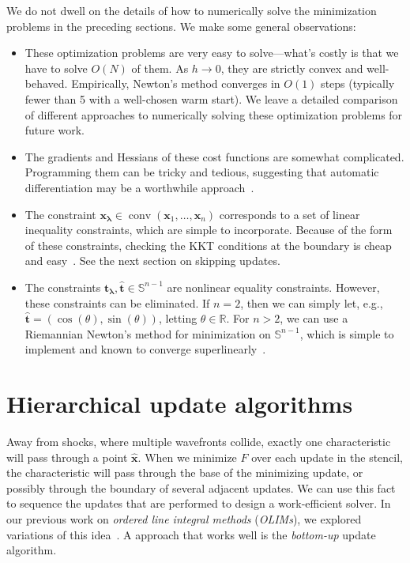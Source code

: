 \documentclass{siamart190516}
\newcommand{\m}[1]{\boldsymbol{#1}}
\newcommand{\xhat}{\hat{\m{x}}}
\newcommand{\xlam}{\m{x}_{\m{\lambda}}}
\newcommand{\that}{\hat{\m{t}}}
\newcommand{\tlam}{\m{t}_{\m{\lambda}}}
\DeclareMathOperator{\conv}{conv}
\begin{document}
We do not dwell on the details of how to numerically solve the
minimization problems in the preceding sections. We make some general
observations:
\begin{itemize}
\item These optimization problems are very easy to solve---what's
  costly is that we have to solve $O(N)$ of them. As $h \to 0$, they
  are strictly convex and well-behaved. Empirically, Newton's method
  converges in $O(1)$ steps (typically fewer than 5 with a well-chosen
  warm start). We leave a detailed comparison of different approaches
  to numerically solving these optimization problems for future work.
\item The gradients and Hessians of these cost functions are somewhat
  complicated. Programming them can be tricky and tedious, suggesting
  that automatic differentiation may be a worthwhile
  approach~\cite{Neidinger:2010aa,Griewank:2008aa}.
\item The constraint $\xlam \in \conv(\m{x}_1, \hdots, \m{x}_n)$
  corresponds to a set of linear inequality constraints, which are
  simple to incorporate. Because of the form of these constraints,
  checking the KKT conditions at the boundary is cheap and easy~\cite{Potter:2019ab,Yang:2019aa}. See
  the next section on skipping updates.
\item The constraints $\tlam, \that \in \mathbb{S}^{n-1}$ are
  nonlinear equality constraints. However, these constraints can be
  eliminated. If $n = 2$, then we can simply let, e.g.,
  $\that = (\cos(\theta), \sin(\theta))$, letting
  $\theta \in \mathbb{R}$. For $n > 2$, we can use a Riemannian
  Newton's method for minimization on $\mathbb{S}^{n-1}$, which is
  simple to implement and known to converge
  superlinearly~\cite{Absil:2009aa}.
\end{itemize}

\section{Hierarchical update algorithms}

Away from shocks, where multiple wavefronts collide, exactly one
characteristic will pass through a point $\xhat$. When we minimize $F$
over each update in the stencil, the characteristic will pass through
the base of the minimizing update, or possibly through the boundary of
several adjacent updates. We can use this fact to sequence the updates
that are performed to design a work-efficient solver. In our previous
work on \emph{ordered line integral methods} (\emph{OLIMs}), we
explored variations of this idea~\cite{Potter:2019ab,Yang:2019aa}. A
approach that works well is the \emph{bottom-up} update algorithm.
\end{document}
